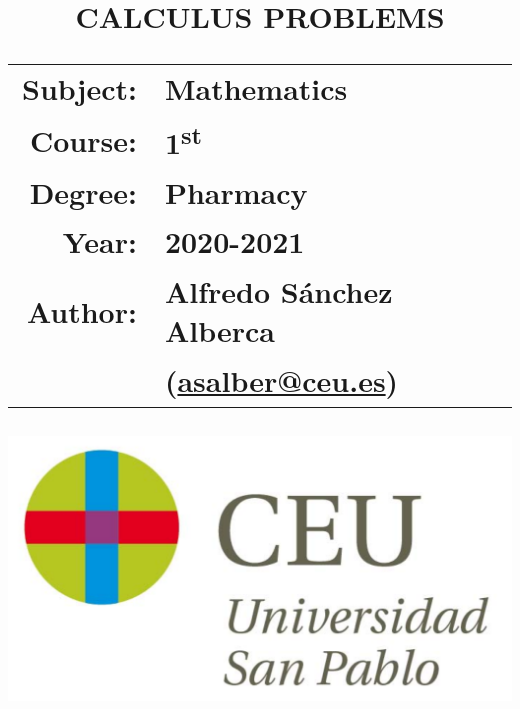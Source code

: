 \documentclass[a4paper,titlepage]{article}
\begin{document}
\sloppy

\title{\vskip 2cm
\Huge \textbf{\textsf{\quad \textcolor{blueceu}{CALCULUS PROBLEMS}\quad}}\\
   \vskip 1cm
\Large \sffamily
\begin{tabular}{rl}
\textcolor{blueceu}{Subject:} & Mathematics\\
\textcolor{blueceu}{Course:} & 1\textsuperscript{st}\\
\textcolor{blueceu}{Degree:} &  Pharmacy\\
\textcolor{blueceu}{Year:} & 2020-2021\\
\textcolor{blueceu}{Author:} & Alfredo S\'anchez Alberca\\  & (\url{asalber@ceu.es})
\end{tabular}
}

\author{}
\date{\includegraphics[scale=0.3]{img/logo_uspceu_01}}

\maketitle
\newpage
\tableofcontents
\newpage











\end{document}
